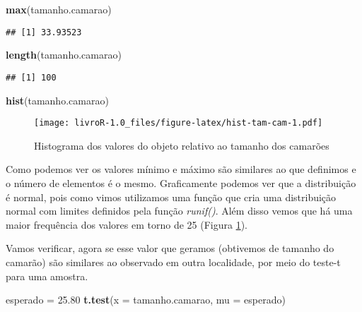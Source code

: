 \documentclass[titlepage, oneside, openany, a4paper]{book}
\newenvironment{Shaded}{\begin{snugshade}}{\end{snugshade}}
\newcommand{\DataTypeTok}[1]{\textcolor[rgb]{0.13,0.29,0.53}{#1}}
\newcommand{\FloatTok}[1]{\textcolor[rgb]{0.00,0.00,0.81}{#1}}
\newcommand{\KeywordTok}[1]{\textcolor[rgb]{0.13,0.29,0.53}{\textbf{#1}}}
\newcommand{\NormalTok}[1]{#1}
\newcommand{\StringTok}[1]{\textcolor[rgb]{0.31,0.60,0.02}{#1}}
\begin{document}
\begin{Shaded}
\begin{Highlighting}[]
\KeywordTok{max}\NormalTok{(tamanho.camarao)}
\end{Highlighting}
\end{Shaded}

\begin{verbatim}
## [1] 33.93523
\end{verbatim}

\begin{Shaded}
\begin{Highlighting}[]
\KeywordTok{length}\NormalTok{(tamanho.camarao)}
\end{Highlighting}
\end{Shaded}

\begin{verbatim}
## [1] 100
\end{verbatim}

\begin{Shaded}
\begin{Highlighting}[]
\KeywordTok{hist}\NormalTok{(tamanho.camarao)}
\end{Highlighting}
\end{Shaded}

\begin{figure}
\centering
\texttt{[image: livroR-1.0\_files/figure-latex/hist-tam-cam-1.pdf]}
\caption{\label{fig:hist-tam-cam}Histograma dos valores do objeto relativo ao tamanho dos camarões}
\end{figure}

Como podemos ver os valores mínimo e máximo são similares ao que definimos e o número de elementos é o mesmo. Graficamente podemos ver que a distribuição é normal, pois como vimos utilizamos uma função que cria uma distribuição normal com limites definidos pela função \emph{runif()}. Além disso vemos que há uma maior frequência dos valores em torno de 25 (Figura \ref{fig:hist-tam-cam}).

Vamos verificar, agora se esse valor que geramos (obtivemos de tamanho do camarão) são similares ao observado em outra localidade, por meio do teste-t para uma amostra.

\begin{Shaded}
\begin{Highlighting}[]
\NormalTok{esperado =}\StringTok{ }\FloatTok{25.80}
\KeywordTok{t.test}\NormalTok{(}\DataTypeTok{x =}\NormalTok{ tamanho.camarao, }\DataTypeTok{mu =}\NormalTok{ esperado)}
\end{Highlighting}
\end{Shaded}
\end{document}
